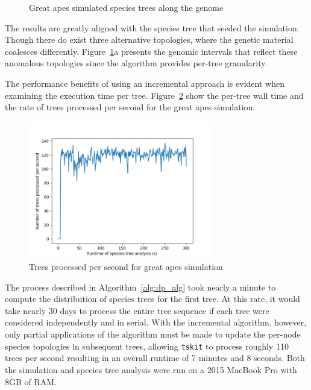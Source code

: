 \documentclass{article}
\newcommand{\tskit}{{\texttt{tskit}}}
\begin{document}
\begin{figure}[H]
\begin{minipage}{.48\textwidth}
\begin{minipage}{.4\textwidth}
\begin{subfigure}[b]{\linewidth}
            \end{subfigure}
        \end{minipage}
        \centering
    \end{minipage}
    \centering
    \caption{Great apes simulated species trees along the genome}
    \label{fig:great_apes}
\end{figure}

The results are greatly aligned with the species tree that seeded the
simulation. Though there do exist three alternative topologies, where the
genetic material coalesces differently. Figure~\ref{fig:great_apes}a presents
the genomic intervals that reflect these anomalous topologies since the algorithm
provides per-tree granularity.

The performance benefits of using an incremental approach is evident when
examining the execution time per tree. Figure~\ref{fig:incremental_times}
show the per-tree wall time and the rate of trees processed per second
for the great apes simulation.
\begin{figure}[H]
    \includegraphics[height=6cm]{trees_per_sec.png}
    \centering
    \caption{Trees processed per second for great apes simulation}
    \label{fig:incremental_times}
\end{figure}

The process described in Algorithm~\ref{alg:dp_alg}
took nearly a minute to compute the distribution of species trees for the first tree.
At this rate, it would take nearly 30 days to process the entire tree sequence if
each tree were considered independently and in serial.
With the incremental algorithm, however, only partial applications of the algorithm
must be made to update the per-node species topologies in subsequent trees, allowing
\tskit{} to process roughly 110 trees per second resulting in an overall
runtime of 7 minutes and 8 seconds. Both the simulation and species tree analysis
were run on a 2015 MacBook Pro with 8GB of RAM.
\end{document}

